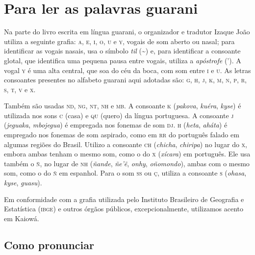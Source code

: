 \chapter{Para ler as palavras guarani}

Na parte do livro escrita em língua guarani, o organizador e tradutor Izaque João utiliza a seguinte grafia: \textsc{a}, \textsc{e}, \textsc{i}, \textsc{o}, \textsc{u} e \textsc{y}, vogais de som aberto ou nasal; para identificar as vogais nasais, usa o símbolo \textit{til} (\textasciitilde{}) e, para identificar a consoante
glotal, que identifica uma pequena pausa entre vogais, utiliza a
\textit{apóstrofe} ('). A vogal \textsc{y} é uma alta central, que soa do céu da boca, com
som entre \textsc{i} e \textsc{u}. As letras consoantes presentes no alfabeto guarani aqui
adotadas são: \textsc{g}, \textsc{h}, \textsc{j}, \textsc{k}, \textsc{m}, \textsc{n}, \textsc{p}, \textsc{r}, \textsc{s}, \textsc{t}, \textsc{v} e \textsc{x}.

Também são usadas \textsc{nd}, \textsc{ng}, \textsc{nt}, \textsc{nh} e \textsc{mb}. A consoante \textsc{k} (\textit{pakova}, \textit{kuéra}, \textit{kyse}) é utilizada nos sons \textsc{c} (casa) e \textsc{qu} (quero) da língua portuguesa. A consoante \textsc{j} (\textit{jeguaka}, \textit{mbojegua}) é empregada nos fonemas de som \textsc{dj}. \textsc{h} (\textit{heta}, \textit{aháta}) é empregado nos
fonemas de som aspirado, como em \textsc{rr} do português falado em algumas
regiões do Brasil. Utilizo a consoante \textsc{ch} (\textit{chicha},
\textit{chiripa}) no lugar do \textsc{x}, embora ambas tenham o mesmo som, como o
do \textsc{x} (\textit{xícara}) em português. Ele usa também o \textsc{ñ}, no lugar de \textsc{nh} (\textit{ñande}, \textit{ñe'ẽ}, \textit{onhy}, \textit{oñomondo}), ambas com o mesmo som, como o do \textsc{ñ} em espanhol. Para o som \textsc{ss} ou \textsc{ç}, utiliza a consoante \textsc{s} (\textit{ohasa}, \textit{kyse}, \textit{guasu}).

Em conformidade com a grafia utilizada pelo Instituto Brasileiro de Geografia e Estatística (\textsc{ibge}) e outros órgãos públicos, excepcionalmente, utilizamos acento em Kaiowá.

\pagebreak
\section{Como pronunciar}

